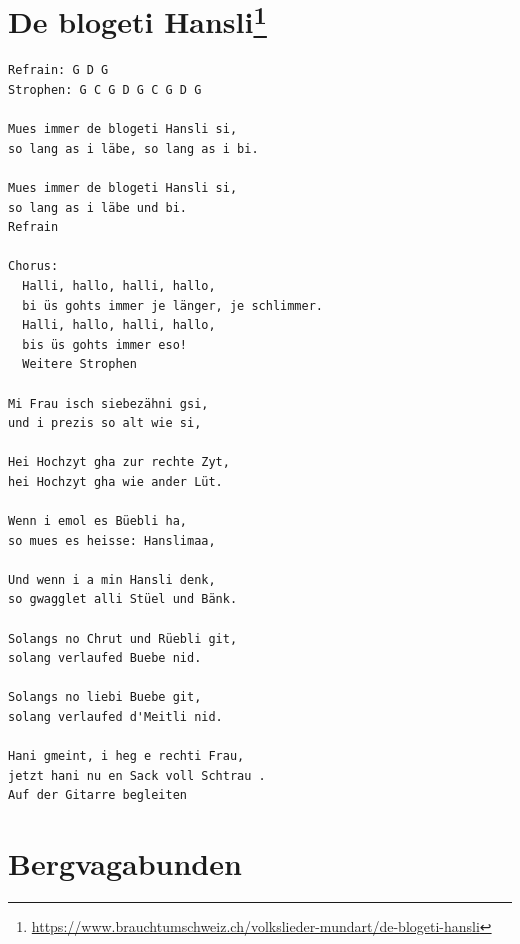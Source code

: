 \documentclass[
]{book}
\let\stdsection\section
\renewcommand\section{\clearpage\stdsection}
\begin{document}
\hypertarget{volkslieder-de-blogeti-hansli}{%
\section[De blogeti Hansli]{\texorpdfstring{De blogeti Hansli\footnote{\url{https://www.brauchtumschweiz.ch/volkslieder-mundart/de-blogeti-hansli}}}{De blogeti Hansli}}\label{volkslieder-de-blogeti-hansli}}

\begin{verbatim}
Refrain: G D G
Strophen: G C G D G C G D G

Mues immer de blogeti Hansli si,
so lang as i läbe, so lang as i bi.

Mues immer de blogeti Hansli si,
so lang as i läbe und bi.
Refrain

Chorus:
  Halli, hallo, halli, hallo,
  bi üs gohts immer je länger, je schlimmer.
  Halli, hallo, halli, hallo,
  bis üs gohts immer eso!
  Weitere Strophen

Mi Frau isch siebezähni gsi,
und i prezis so alt wie si,

Hei Hochzyt gha zur rechte Zyt,
hei Hochzyt gha wie ander Lüt.

Wenn i emol es Büebli ha,
so mues es heisse: Hanslimaa,

Und wenn i a min Hansli denk,
so gwagglet alli Stüel und Bänk.

Solangs no Chrut und Rüebli git,
solang verlaufed Buebe nid.

Solangs no liebi Buebe git,
solang verlaufed d'Meitli nid.

Hani gmeint, i heg e rechti Frau,
jetzt hani nu en Sack voll Schtrau .
Auf der Gitarre begleiten

\end{verbatim}

\hypertarget{volkslieder-bergvagabunden}{%
\section{Bergvagabunden}\label{volkslieder-bergvagabunden}}
\end{document}
